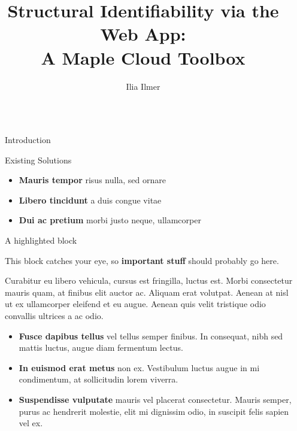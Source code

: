 \documentclass[final]{beamer}
\title{Structural Identifiability via the Web App:\\A Maple Cloud Toolbox}
\author{Ilia Ilmer \inst{1}}
\institute[shortinst]{\inst{1} CUNY Graduate Center}%
\newlength{\sepwidth}
\newlength{\colwidth}
\newcommand{\separatorcolumn}{\begin{column}{\sepwidth}\end{column}}
\begin{document}
\begin{frame}[t]
    \begin{columns}[t]
        \separatorcolumn

        \begin{column}{\colwidth}

            \begin{block}{Introduction}

            \end{block}

            \begin{block}{Existing Solutions}

                \begin{itemize}
                    \item \textbf{Mauris tempor} risus nulla, sed ornare
                    \item \textbf{Libero tincidunt} a duis congue vitae
                    \item \textbf{Dui ac pretium} morbi justo neque, ullamcorper
                \end{itemize}

            \end{block}

            \begin{alertblock}{A highlighted block}

                This block catches your eye, so \textbf{important stuff} should probably go
                here.

                Curabitur eu libero vehicula, cursus est fringilla, luctus est. Morbi
                consectetur mauris quam, at finibus elit auctor ac. Aliquam erat volutpat.
                Aenean at nisl ut ex ullamcorper eleifend et eu augue. Aenean quis velit
                tristique odio convallis ultrices a ac odio.

                \begin{itemize}
                    \item \textbf{Fusce dapibus tellus} vel tellus semper finibus. In
                          consequat, nibh sed mattis luctus, augue diam fermentum lectus.
                    \item \textbf{In euismod erat metus} non ex. Vestibulum luctus augue in
                          mi condimentum, at sollicitudin lorem viverra.
                    \item \textbf{Suspendisse vulputate} mauris vel placerat consectetur.
                          Mauris semper, purus ac hendrerit molestie, elit mi dignissim odio, in
                          suscipit felis sapien vel ex.
                \end{itemize}


\end{alertblock}
\end{column}
\end{columns}
\end{frame}
\end{document}
